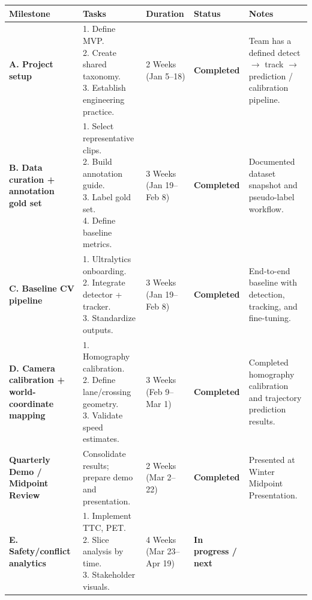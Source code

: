 \documentclass[12pt,letterpaper]{article}
\begin{document}
\begin{longtable}{|p{2.8cm}|p{3.5cm}|p{1.8cm}|p{1.5cm}|p{3cm}|}
\hline
\textbf{Milestone} & \textbf{Tasks} & \textbf{Duration} & \textbf{Status} & \textbf{Notes} \\
\hline
\endhead
\textbf{A. Project setup} &
\makecell[l]{1. Define MVP. \\ 2. Create shared taxonomy. \\ 3. Establish engineering practice.} &
2 Weeks \newline (Jan 5--18) & \textbf{Completed} &
Team has a defined detect $\to$ track $\to$ prediction / calibration pipeline. \\
\hline
\textbf{B. Data curation + annotation gold set} &
\makecell[l]{1. Select representative clips. \\ 2. Build annotation guide. \\ 3. Label gold set. \\ 4. Define baseline metrics.} &
3 Weeks \newline (Jan 19--Feb 8) & \textbf{Completed} &
Documented dataset snapshot and pseudo-label workflow. \\
\hline
\textbf{C. Baseline CV pipeline} &
\makecell[l]{1. Ultralytics onboarding. \\ 2. Integrate detector + tracker. \\ 3. Standardize outputs.} &
3 Weeks \newline (Jan 19--Feb 8) & \textbf{Completed} &
End-to-end baseline with detection, tracking, and fine-tuning. \\
\hline
\textbf{D. Camera calibration + world-coordinate mapping} &
\makecell[l]{1. Homography calibration. \\ 2. Define lane/crossing geometry. \\ 3. Validate speed estimates.} &
3 Weeks \newline (Feb 9--Mar 1) & \textbf{Completed} &
Completed homography calibration and trajectory prediction results. \\
\hline
\textbf{Quarterly Demo / Midpoint Review} &
Consolidate results; prepare demo and presentation. &
2 Weeks \newline (Mar 2--22) & \textbf{Completed} &
Presented at Winter Midpoint Presentation. \\
\hline
\textbf{E. Safety/conflict analytics} &
\makecell[l]{1. Implement TTC, PET. \\ 2. Slice analysis by time. \\ 3. Stakeholder visuals.} &
4 Weeks \newline (Mar 23--Apr 19) & \textbf{In progress / next} &

\end{longtable}
\end{document}
